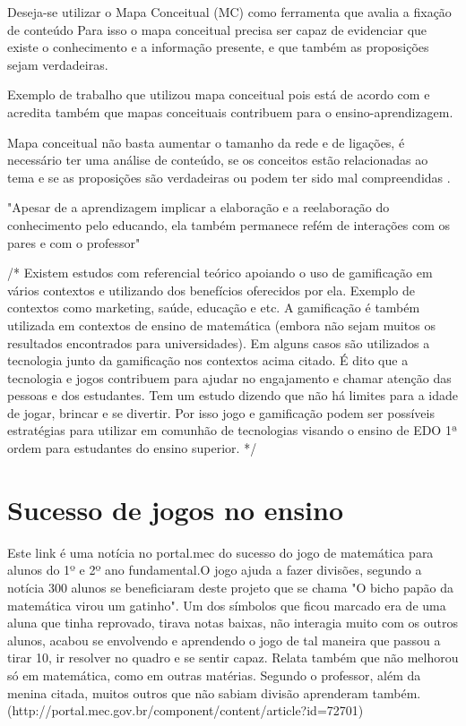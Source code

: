 Deseja-se utilizar o Mapa Conceitual (MC) como ferramenta que avalia a fixação de conteúdo Para isso o mapa conceitual precisa ser capaz de evidenciar que existe o conhecimento e a informação presente, e que também as proposições sejam verdadeiras.  


Exemplo de trabalho que utilizou mapa conceitual \cite{leiDeNewtonMC} pois está de acordo com \cite{novak} e acredita também que mapas conceituais contribuem para o ensino-aprendizagem. 


Mapa conceitual não basta aumentar o tamanho da rede e de ligações, é necessário ter uma análise de conteúdo, se os conceitos estão relacionadas ao tema e se as proposições são verdadeiras ou podem ter sido mal compreendidas \cite{vantagensDesvantagensMC}.

"Apesar de a aprendizagem implicar a elaboração e a reelaboração do conhecimento pelo educando, ela também permanece refém de interações com os pares e com o professor" \cite[p. 180]{vantagensDesvantagensMC}



/*
Existem estudos com referencial teórico apoiando o uso de gamificação em vários contextos e utilizando dos benefícios oferecidos por ela. Exemplo de contextos como marketing, saúde, educação e etc. A gamificação é também utilizada em contextos de ensino de matemática (embora não sejam muitos os resultados encontrados para universidades). Em alguns casos são utilizados a tecnologia junto da gamificação nos contextos acima citado. É dito que a tecnologia e jogos contribuem para ajudar no engajamento e chamar atenção das pessoas e dos estudantes.
Tem um estudo dizendo que não há limites para a idade de jogar, brincar e se divertir. Por isso jogo e gamificação podem ser possíveis estratégias para utilizar em comunhão de tecnologias visando o ensino de EDO 1ª ordem para estudantes do ensino superior.
 */


\section[Sucesso de jogos no ensino]{Sucesso de jogos no ensino}

Este link é uma notícia no portal.mec do sucesso do jogo de matemática para alunos do 1º e 2º ano fundamental.O jogo ajuda a fazer divisões, segundo a notícia 300 alunos se beneficiaram deste projeto que se chama "O bicho papão da matemática virou um gatinho". Um dos símbolos que ficou marcado era de uma aluna que tinha reprovado, tirava notas baixas, não interagia muito com os outros alunos, acabou se envolvendo e aprendendo o jogo de tal maneira que passou a tirar 10, ir resolver no quadro e se sentir capaz. Relata também que não melhorou só em matemática, como em outras matérias. Segundo o professor, além da menina citada, muitos outros que não sabiam divisão aprenderam também. (http://portal.mec.gov.br/component/content/article?id=72701)

